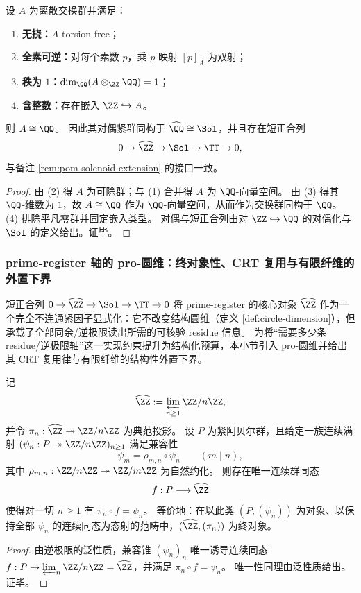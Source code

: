 \begin{theorem}\label{thm:cdim-cdim1-divisible-implies-Q}
设 \(A\) 为离散交换群并满足：
\begin{enumerate}
  \item \textbf{无挠：}\(A\) torsion-free；
  \item \textbf{全素可逆：}对每个素数 \(p\)，乘 \(p\) 映射 \([p]_A\) 为双射；
  \item \textbf{秩为 \(1\)：}\(\dim_{\QQ}(A\otimes_{\ZZ}\QQ)=1\)；
  \item \textbf{含整数：}存在嵌入 \(\ZZ\hookrightarrow A\)。
\end{enumerate}
则 \(A\cong\QQ\)。
因此其对偶紧群同构于 \(\widehat{\QQ}\cong\Sol\)，并且存在短正合列
\[
0\to \widehat{\ZZ}\to \Sol\to \TT\to 0,
\]
与备注 \ref{rem:pom-solenoid-extension} 的接口一致。
\end{theorem}
\begin{proof}
由 (2) 得 \(A\) 为可除群；与 (1) 合并得 \(A\) 为 \(\QQ\)-向量空间。
由 (3) 得其 \(\QQ\)-维数为 \(1\)，故 \(A\cong\QQ\) 作为 \(\QQ\)-向量空间，从而作为交换群同构于 \(\QQ\)。
(4) 排除平凡零群并固定嵌入类型。
对偶与短正合列由对 \(\ZZ\hookrightarrow\QQ\) 的对偶化与 \(\Sol\) 的定义给出。证毕。
\end{proof}

\subsubsection{prime-register 轴的 pro-圆维：终对象性、CRT 复用与有限纤维的外置下界}\label{subsubsec:cdim-prime-register-pro-cdim}
短正合列 \(0\to \widehat{\ZZ}\to\Sol\to\TT\to 0\) 将 prime-register 的核心对象 \(\widehat{\ZZ}\) 作为一个完全不连通紧因子显式化：它不改变结构圆维（定义 \ref{def:circle-dimension}），但承载了全部同余/逆极限读出所需的可核验 residue 信息。
为将“需要多少条 residue/逆极限轴”这一实现约束提升为结构化预算，本小节引入 pro-圆维并给出其 CRT 复用律与有限纤维的结构性外置下界。

\begin{theorem}\label{thm:cdim-zhatZ-terminal-residue-axis}
记
\[
\widehat{\ZZ}:=\varprojlim_{n\ge 1}\ZZ/n\ZZ,
\]
并令 \(\pi_n:\widehat{\ZZ}\twoheadrightarrow \ZZ/n\ZZ\) 为典范投影。
设 \(P\) 为紧阿贝尔群，且给定一族连续满射 \((\psi_n:P\twoheadrightarrow \ZZ/n\ZZ)_{n\ge 1}\) 满足兼容性
\[
\psi_m=\rho_{m,n}\circ \psi_n\qquad(m\mid n),
\]
其中 \(\rho_{m,n}:\ZZ/n\ZZ\twoheadrightarrow \ZZ/m\ZZ\) 为自然约化。
则存在唯一连续群同态
\[
f:P\longrightarrow \widehat{\ZZ}
\]
使得对一切 \(n\ge 1\) 有 \(\pi_n\circ f=\psi_n\)。
等价地：在以此类 \((P,(\psi_n))\) 为对象、以保持全部 \(\psi_n\) 的连续同态为态射的范畴中，\((\widehat{\ZZ},(\pi_n))\) 为终对象。
\end{theorem}
\begin{proof}
由逆极限的泛性质，兼容锥 \((\psi_n)_n\) 唯一诱导连续同态 \(f:P\to\varprojlim_n \ZZ/n\ZZ=\widehat{\ZZ}\)，并满足 \(\pi_n\circ f=\psi_n\)。
唯一性同理由泛性质给出。证毕。
\end{proof}

